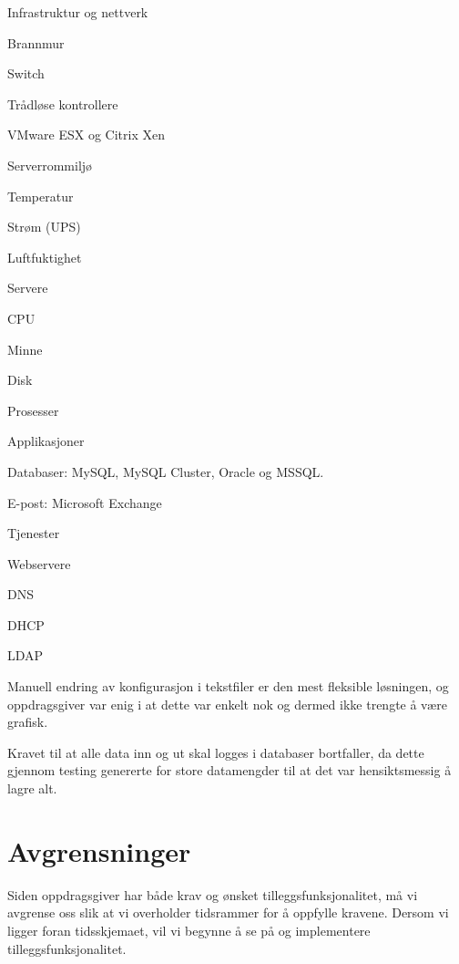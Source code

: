 \begin{itemize*}
	\item Infrastruktur og nettverk
	\begin{itemize*}
		\item Brannmur
		\item Switch
		\item Trådløse kontrollere
		\item VMware ESX og Citrix Xen
		\item Serverrommiljø
		\begin{itemize*}
			\item Temperatur
			\item Strøm (UPS)
			\item Luftfuktighet
		\end{itemize*}
	\end{itemize*}
	\item Servere
	\begin{itemize*}
		\item CPU
		\item Minne
		\item Disk
		\item Prosesser
		\item Applikasjoner
		\item Databaser: MySQL, MySQL Cluster, Oracle og MSSQL.
		\item E-post: Microsoft Exchange
		\item Tjenester
		\begin{itemize*}
			\item Webservere
			\item DNS 
			\item DHCP
			\item LDAP
		\end{itemize*}
	\end{itemize*}
\end{itemize*}

Manuell endring av konfigurasjon i tekstfiler er den mest fleksible løsningen, og oppdragsgiver var enig i at dette var enkelt nok og dermed ikke trengte å være grafisk.

Kravet til at alle data inn og ut skal logges i databaser bortfaller, da dette gjennom testing genererte for store datamengder til at det var hensiktsmessig å lagre alt.

\section{Avgrensninger}
Siden oppdragsgiver har både krav og ønsket tilleggsfunksjonalitet, må vi avgrense oss slik at vi overholder tidsrammer for å oppfylle kravene. Dersom vi ligger foran tidsskjemaet, vil vi begynne å se på og implementere tilleggsfunksjonalitet.

